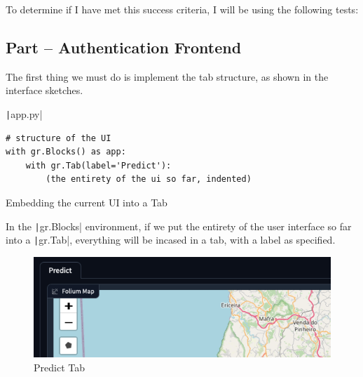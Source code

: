\documentclass[12pt]{report}
\newcommand{\pil}[1]{\protect\texttt|#1|}
\begin{document}
To determine if I have met this success criteria, I will be using the following tests:

\begin{center}
\end{center}

\subsection{Part \theparts{} -- Authentication Frontend}

The first thing we must do is implement the tab structure, as shown in the interface sketches.

\begin{listing}[H]
\pil{app.py}
\begin{verbatim}
# structure of the UI
with gr.Blocks() as app:
    with gr.Tab(label='Predict'):
        (the entirety of the ui so far, indented)
\end{verbatim}
\caption{Embedding the current UI into a Tab}\label{cs:addingTabs}
\end{listing}

In the \pil{gr.Blocks} environment, if we put the entirety of the user interface so far into a \pil{gr.Tab}, everything will be incased in a tab, with a label as specified.

\begin{figure}[H]
\centering
\includegraphics[width=12cm]{ss14.1.png}
\caption{Predict Tab}\label{fig:ss14.1}
\end{figure}
\end{document}
